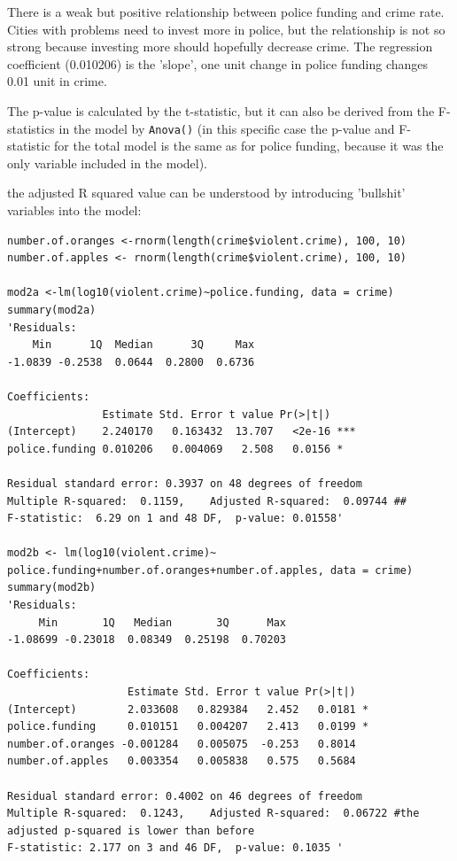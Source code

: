 \documentclass{article}
\begin{document}
There is a weak but positive relationship between police funding and crime rate. Cities with problems need to invest more in police, but the relationship is not so strong because investing more should hopefully decrease crime. The regression coefficient (0.010206) is the 'slope', one unit change in police funding changes 0.01 unit in crime. \par 
The p-value is calculated by the t-statistic, but it can also be derived from the F-statistics in the model by \texttt{Anova()} (in this specific case the p-value and F-statistic for the total model is the same as for police funding, because it was the only variable included in the model).\par 
the adjusted R squared value can be understood by introducing 'bullshit' variables into the model:

\begin{lstlisting}
number.of.oranges <-rnorm(length(crime$violent.crime), 100, 10)
number.of.apples <- rnorm(length(crime$violent.crime), 100, 10)

mod2a <-lm(log10(violent.crime)~police.funding, data = crime)
summary(mod2a)
'Residuals:
    Min      1Q  Median      3Q     Max 
-1.0839 -0.2538  0.0644  0.2800  0.6736 

Coefficients:
               Estimate Std. Error t value Pr(>|t|)    
(Intercept)    2.240170   0.163432  13.707   <2e-16 ***
police.funding 0.010206   0.004069   2.508   0.0156 *  

Residual standard error: 0.3937 on 48 degrees of freedom
Multiple R-squared:  0.1159,	Adjusted R-squared:  0.09744 ##
F-statistic:  6.29 on 1 and 48 DF,  p-value: 0.01558'

mod2b <- lm(log10(violent.crime)~ police.funding+number.of.oranges+number.of.apples, data = crime)
summary(mod2b)
'Residuals:
     Min       1Q   Median       3Q      Max 
-1.08699 -0.23018  0.08349  0.25198  0.70203 

Coefficients:
                   Estimate Std. Error t value Pr(>|t|)  
(Intercept)        2.033608   0.829384   2.452   0.0181 *
police.funding     0.010151   0.004207   2.413   0.0199 *
number.of.oranges -0.001284   0.005075  -0.253   0.8014  
number.of.apples   0.003354   0.005838   0.575   0.5684  

Residual standard error: 0.4002 on 46 degrees of freedom
Multiple R-squared:  0.1243,	Adjusted R-squared:  0.06722 #the adjusted p-squared is lower than before
F-statistic: 2.177 on 3 and 46 DF,  p-value: 0.1035 '
\end{lstlisting}
\end{document}
